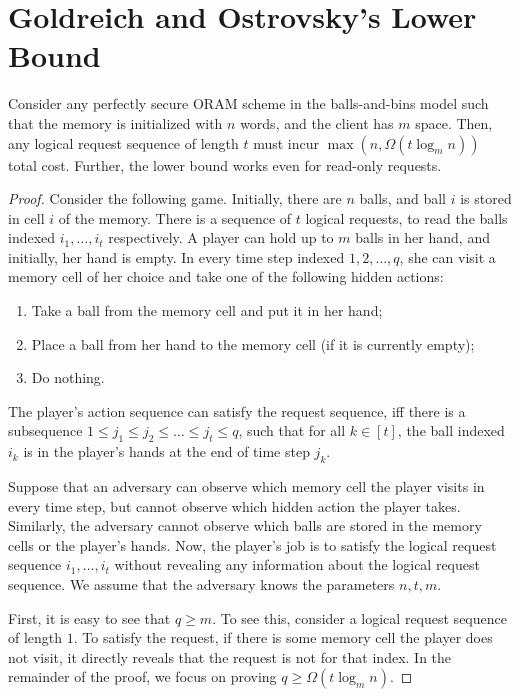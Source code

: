 \section{Goldreich and Ostrovsky's Lower Bound}

\begin{theorem}
Consider any perfectly secure ORAM scheme in the balls-and-bins model
such that the memory is  
initialized with $n$ words, and the client has $m$ space. 
Then, any 
logical request sequence of length $t$ 
must incur $\max(n, \Omega(t \log_m n))$ total cost. 
Further, the lower bound works even for read-only 
requests. 
\end{theorem}
\begin{proof}
Consider the following game. 
Initially, there are $n$ balls, and ball $i$ is stored in cell $i$
of the memory.
There is a sequence of $t$ logical requests, to read
the balls indexed $i_1, \ldots, i_t$ respectively.
A player 
can hold up to $m$ balls in her hand, and initially, her hand is empty.
In every time step indexed $1, 2, \ldots, q$, she 
can visit a memory cell of her choice and 
take one of the following hidden actions: 
\begin{enumerate}[itemsep=1pt]
\item 
Take a ball from the memory cell and put it in her hand;
\item 
Place a ball from her hand to the memory cell (if it is currently empty);
\item 
Do nothing.
\end{enumerate}
The player's action sequence 
can satisfy the request sequence, iff there is  
a subsequence 
$1\leq j_1 \leq j_2 \leq \ldots \leq j_t \leq q$, such
that for all $k \in [t]$, 
the ball indexed $i_k$ is in the player's hands
at the end of 
time step $j_k$. 

Suppose that an adversary can observe which memory cell
the player visits in every time step,  
but cannot observe which hidden action the player takes. 
Similarly, the adversary cannot observe which balls are 
stored in the memory cells or the player's hands.
Now, the player's job is to satisfy the logical request
sequence $i_1, \ldots, i_t$ without revealing any information 
about the logical request sequence.
We assume that the adversary knows the parameters $n, t, m$.

First, it is easy to see that $q \geq m$. 
To see this, consider a logical request sequence of length $1$.
To satisfy the request, 
if there is some memory cell the player does not visit, it directly
reveals
that the request is not for that index.
In the remainder of the proof, we focus on proving
$q \geq \Omega(t \log_m n)$.


\end{proof}
